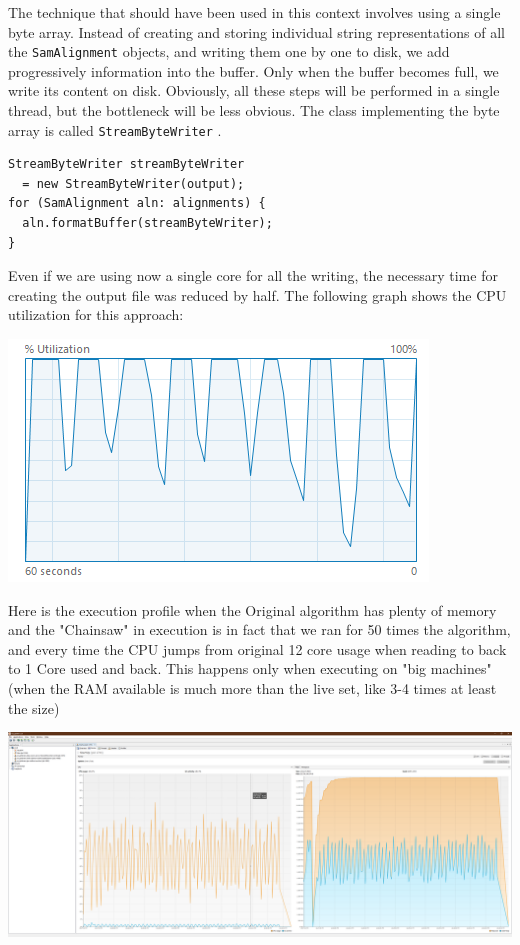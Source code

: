 \documentclass[a4paper,twoside]{article}
\begin{document}
The technique that should have been used in this context involves using a single byte array.
Instead of creating and storing individual string representations of all the {\texttt{SamAlignment} } objects, and writing them one by one to disk, we add progressively information into the buffer.
Only when the buffer becomes full, we write its content on disk.
Obviously, all these steps will be performed in a single thread, but the bottleneck will be less obvious.
The class implementing the byte array is called {\texttt{StreamByteWriter} }.
\begin{verbatim}
StreamByteWriter streamByteWriter 
  = new StreamByteWriter(output);
for (SamAlignment aln: alignments) {
  aln.formatBuffer(streamByteWriter);
}
\end{verbatim}
Even if we are using now a single core for all the writing, the necessary time for creating the output file was reduced by half.
The following graph shows the CPU utilization for this approach:
\begin{center}
\includegraphics[scale=0.5]{images/cpu_optimized.png}
\end{center}

Here is the execution profile when the Original algorithm has plenty of memory and the "Chainsaw" in execution is in fact that we ran for 50 times the algorithm, and every time the CPU jumps from original 12 core usage when reading to back to 1 Core used and back.
This happens only when executing on "big machines" (when the RAM available is much more than the live set, like 3-4 times at least the size)
\begin{center}
	\includegraphics[scale=0.065]{images/Visual_VM_Small_file_Original_execution_profile.png}
\end{center}
\end{document}
